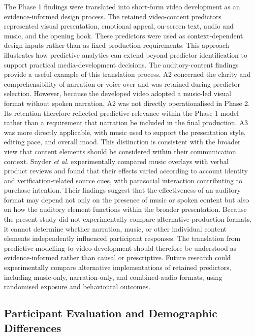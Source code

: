 \documentclass[jtaer,article,submit,moreauthors]{Definitions/mdpi}
\begin{document}
The Phase 1 findings were translated into short-form video development
as an evidence-informed design process. The retained video-content
predictors represented visual presentation, emotional appeal,
on-screen text, audio and music, and the opening hook. These predictors
were used as context-dependent design inputs rather than as fixed
production requirements. This approach illustrates how predictive
analytics can extend beyond predictor identification to support
practical media-development decisions.
The auditory-content findings provide a useful example of this
translation process. A2 concerned the clarity and comprehensibility of
narration or voice-over and was retained during predictor selection.
However, because the developed video adopted a music-led visual format
without spoken narration, A2 was not directly operationalised in
Phase 2. Its retention therefore reflected predictive relevance within
the Phase 1 model rather than a requirement that narration be included
in the final production. A3 was more directly applicable, with music
used to support the presentation style, editing pace, and overall mood.
This distinction is consistent with the broader view that content
elements should be considered within their communication context.
Snyder \textit{et al}. \cite{Snyder2026} experimentally compared music
overlays with verbal product reviews and found that their effects varied
according to account identity and verification-related source cues, with
parasocial interaction contributing to purchase intention. Their
findings suggest that the effectiveness of an auditory format may
depend not only on the presence of music or spoken content but also on
how the auditory element functions within the broader presentation.
Because the present study did not experimentally compare alternative
production formats, it cannot determine whether narration, music, or
other individual content elements independently influenced participant
responses. The translation from predictive modelling to video
development should therefore be understood as evidence-informed rather
than causal or prescriptive. Future research could experimentally
compare alternative implementations of retained predictors, including
music-only, narration-only, and combined-audio formats, using
randomised exposure and behavioural outcomes.


\subsection{Participant Evaluation and Demographic Differences}
\end{document}
